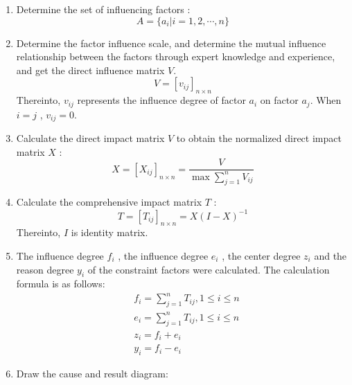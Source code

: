 \documentclass[12pt]{article}  %
\begin{document}
\begin{enumerate}
    \renewcommand{\labelenumi}{\textbf{Step \theenumi}}
    \item Determine the set of influencing factors :
\begin{equation}
A=\{a_i|i=1,2,\cdots ,n\}
\end{equation}
    \item Determine the factor influence scale, and determine the mutual influence relationship between 
the factors through expert knowledge and experience, and get the direct influence matrix $V$.
\begin{equation}
    V=[v_{ij}]_{n\times n}
\end{equation}
Thereinto, $v_{ij}$ represents the influence degree of factor $a_i$ on factor $a_j$. When $i=j$ , $v_{ij}=0$.
    \item  Calculate the direct impact matrix $V$ to obtain the normalized direct impact matrix $X$ :
    \begin{equation}
X=[X_{ij}]_{n\times n}=\frac{V}{\max \sum_{j=1}^{n}V_{ij}}
\end{equation}
    \item Calculate the comprehensive impact matrix $T$ :
\begin{equation}
T=[T_{ij}]_{n\times n}=X(I-X)^{-1}
\end{equation}
Thereinto, $I$ is identity matrix.
    \item The influence degree $f_i$ , the influence degree $e_i$ , the center degree $z_i$ and the reason degree $y_i$ of 
the constraint factors were calculated. The calculation formula is as follows:
\begin{eqnarray}
    &f_i=\sum_{j=1}^{n}T_{ij},1\le i\le n \\
    &e_i=\sum_{j=1}^{n}T_{ij},1\le i\le n\\ 
    &z_i=f_i+e_i\\
    &y_i=f_i-e_i
\end{eqnarray}
    \item Draw the cause and result diagram:


\end{enumerate}
\end{document}
